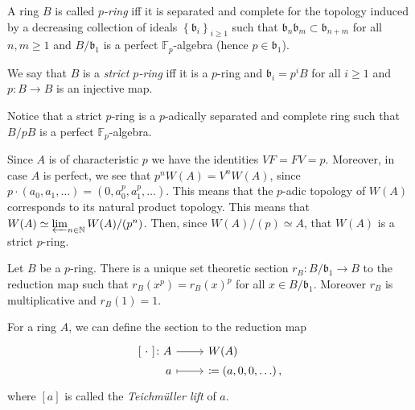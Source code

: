 \begin{defn}
	A ring $B$ is called {\em $p$-ring} iff it is separated and complete
	for the topology induced by a decreasing collection of ideals
	$\left\{ \mathfrak{b}_i \right\}_{i \geq 1}$ such that 
	$\mathfrak{b}_n \mathfrak{b}_m \subset \mathfrak{b}_{n+m}$
	for all $n,m \geq 1$
	and $B/\mathfrak{b}_1$ is a perfect $\mathbb{F}_p$-algebra
	(hence $p \in \mathfrak{b}_1$).

	We say that $B$ is a {\em strict $p$-ring} iff it is a $p$-ring
	and $\mathfrak{b}_i = p^iB$ for all $i \geq 1$
	and $p\colon B \to B$ is an injective map.
\end{defn}


\begin{rem}[]
	Notice that a strict $p$-ring is a $p$-adically separated and complete
	ring such that $B/pB$ is a perfect $\mathbb{F}_p$-algebra.
\end{rem}


\begin{rem}[]
	Since $A$ is of characteristic $p$ we have the identities
	$VF = FV = p$.
	Moreover, in case $A$ is perfect, we see that $p^nW(A) = V^nW(A)$,
	since $p \cdot \left( a_0, a_1, \ldots \right) =
	(0, a_0^p, a_1^p, \ldots)$.
	This means that the $p$-adic topology of $W(A)$ corresponds
	to its natural product topology.
	This means that $W(A) \simeq \varprojlim_{n \in \mathbb{N}} W(A)/ (p^n)$.
	Then, since $W(A)/ (p) \simeq A$, that $W(A)$ is a strict $p$-ring.
\end{rem}


\begin{lem}\label{pRingSection}
	Let $B$ be a $p$-ring.
	There is a unique set theoretic section
	$r_B\colon B/\mathfrak{b}_1 \to B$
	to the reduction map such that
	$r_B(x^p) = r_B(x)^p$
	for all $x \in B/\mathfrak{b}_1$.
	Moreover $r_B$ is multiplicative and $r_B(1) = 1$.
\end{lem} 


\begin{defn}
	For a ring $A$, we can define the section to the reduction map
	\begin{equation*}
	\begin{tikzcd}[row sep = 0ex
		,/tikz/column 1/.append style={anchor=base east}
		,/tikz/column 2/.append style={anchor=base west}]
		[\ \cdot \ ]\colon A \arrow[r, "", rightarrow] &
		W(A) \\
		a \arrow[r, "", mapsto] &
		[a] \coloneqq \left( a, 0, 0, \ldots \right)
	,\end{tikzcd}
	\end{equation*} 
	where $[a]$ is called the {\em Teichmüller lift} of $a$.
\end{defn}


